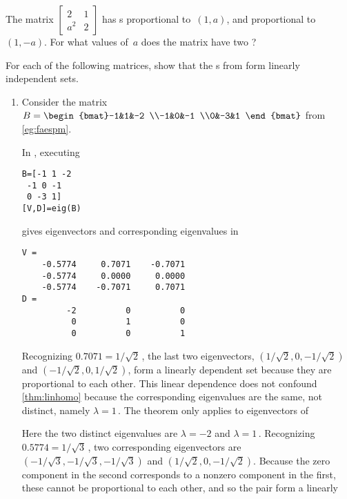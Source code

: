 \begin{activity}
The matrix \(\begin{bmatrix} 2&1\\a^2&2 \end{bmatrix}\) has s proportional to~\((1,a)\), and proportional to~\((1,-a)\).
For what values of~\(a\) does the matrix have two ?
\end{activity}






\begin{example} \label{eg:indepev}
For each of the following matrices, show that the s from  form linearly independent sets.
\begin{enumerate}[ref=\ref{eg:indepev}(\alph*)]
\item  Consider the matrix \(B=\begin{bmat}-1&1&-2
\\-1&0&-1
\\0&-3&1 \end{bmat}\) from \cref{eg:faespm}.
\begin{solution} \sloppy
In \script, executing 
\begin{verbatim}
B=[-1 1 -2
 -1 0 -1
 0 -3 1]
[V,D]=eig(B)
\end{verbatim}
\setbox\ajrqrbox\hbox{}%
\marginajrbox%
gives eigenvectors and corresponding eigenvalues in
\begin{verbatim}
V =
    -0.5774     0.7071    -0.7071
    -0.5774     0.0000     0.0000
    -0.5774    -0.7071     0.7071
D =
         -2          0          0
          0          1          0
          0          0          1
\end{verbatim} 
Recognizing \(0.7071=1/\sqrt2\)\,, the last two eigenvectors, \((1/\sqrt2,0,-1/\sqrt2)\) and  \((-1/\sqrt2,0,1/\sqrt2)\), form a linearly dependent set because they are proportional to each other.
This linear dependence does not confound  \cref{thm:linhomo} because the corresponding eigenvalues are the same, not distinct, namely \(\lambda=1\)\,.
The theorem only applies to eigenvectors of 

Here the two distinct eigenvalues are \(\lambda=-2\) and \(\lambda=1\)\,.
Recognizing \(0.5774=1/\sqrt3\)\,, two corresponding eigenvectors are \((-1/\sqrt3,-1/\sqrt3,-1/\sqrt3)\) and \((1/\sqrt2,0,-1/\sqrt2)\).
Because the zero component in the second corresponds to a nonzero component in the first, these cannot be proportional to each other, and so the pair form a linearly 
\end{solution}



\end{enumerate}
\end{example}
